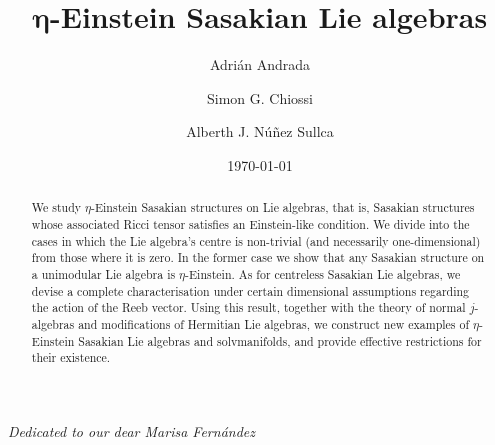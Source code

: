 \documentclass[12pt, twoside]{amsart}
\theoremstyle{definition}
\begin{document}
\title{$\boldsymbol \eta$-Einstein Sasakian Lie algebras}
\date{\today}

\subjclass[2000]{}

\author[Andrada]{Adri{\'a}n  Andrada}
\address[\href{mailto:adrian.andrada@unc.edu.ar}{AA}]{FaMAF, Universidad Nacional de C\'ordoba and Ciem-Conicet, Av. Medina Allende s/n, Ciudad Universitaria, X5000HUA C\'ordoba (AR)}

\author[Chiossi]{Simon G. Chiossi}
\address[\href{mailto:simongc@id.uff.br}{SGC}]{
Departamento de Matem{\'a}tica Aplicada, Instituto de Matem{\'a}tica e 
Estat{\'i}stica, Universidade Federal Fluminense, Rua professor Marcos Waldemar de Freitas Reis s/n (bloco G), 24210-201 Niter{\'o}i/RJ (BR)}

\author[N\~unez]{Alberth J. N{\'u}\~nez Sullca}
\address[\href{mailto:alberthnunez@id.uff.br}{AN}]{
PGMat, Instituto de Matem{\'a}tica e Estat{\'i}stica, Universidade Federal Fluminense, Rua professor Marcos Waldemar de Freitas Reis s/n (bloco H), 24210-201 Niter{\'o}i/RJ (BR)}


\frenchspacing
\thispagestyle{empty}

\begin{abstract}
We study $\eta$-Einstein Sasakian structures on Lie algebras, that is, Sasakian structures whose associated Ricci tensor satisfies an Einstein-like condition. We  divide into the cases in which the Lie algebra's centre is non-trivial (and necessarily one-dimensional) from those where it is zero. In the former case we show that any Sasakian structure on a unimodular Lie algebra is $\eta$-Einstein. As for centreless Sasakian Lie algebras, we devise a complete characterisation under certain dimensional assumptions regarding the action of the Reeb vector. Using this result, together with the theory of normal $j$-algebras and modifications of Hermitian Lie algebras, we construct new examples of $\eta$-Einstein Sasakian Lie algebras and solvmanifolds, and provide effective  restrictions for their existence. 
\end{abstract}

\maketitle

\begin{center}{\it Dedicated to our dear Marisa Fern{\'a}ndez}\end{center}
\end{document}
